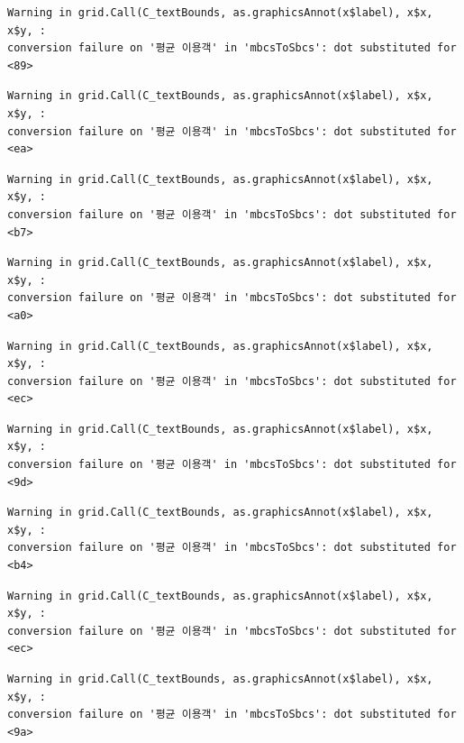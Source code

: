 \documentclass[
  letterpaper,
  DIV=11,
  numbers=noendperiod]{scrreprt}
\begin{document}
\begin{verbatim}
Warning in grid.Call(C_textBounds, as.graphicsAnnot(x$label), x$x, x$y, :
conversion failure on '평균 이용객' in 'mbcsToSbcs': dot substituted for <89>
\end{verbatim}

\begin{verbatim}
Warning in grid.Call(C_textBounds, as.graphicsAnnot(x$label), x$x, x$y, :
conversion failure on '평균 이용객' in 'mbcsToSbcs': dot substituted for <ea>
\end{verbatim}

\begin{verbatim}
Warning in grid.Call(C_textBounds, as.graphicsAnnot(x$label), x$x, x$y, :
conversion failure on '평균 이용객' in 'mbcsToSbcs': dot substituted for <b7>
\end{verbatim}

\begin{verbatim}
Warning in grid.Call(C_textBounds, as.graphicsAnnot(x$label), x$x, x$y, :
conversion failure on '평균 이용객' in 'mbcsToSbcs': dot substituted for <a0>
\end{verbatim}

\begin{verbatim}
Warning in grid.Call(C_textBounds, as.graphicsAnnot(x$label), x$x, x$y, :
conversion failure on '평균 이용객' in 'mbcsToSbcs': dot substituted for <ec>
\end{verbatim}

\begin{verbatim}
Warning in grid.Call(C_textBounds, as.graphicsAnnot(x$label), x$x, x$y, :
conversion failure on '평균 이용객' in 'mbcsToSbcs': dot substituted for <9d>
\end{verbatim}

\begin{verbatim}
Warning in grid.Call(C_textBounds, as.graphicsAnnot(x$label), x$x, x$y, :
conversion failure on '평균 이용객' in 'mbcsToSbcs': dot substituted for <b4>
\end{verbatim}

\begin{verbatim}
Warning in grid.Call(C_textBounds, as.graphicsAnnot(x$label), x$x, x$y, :
conversion failure on '평균 이용객' in 'mbcsToSbcs': dot substituted for <ec>
\end{verbatim}

\begin{verbatim}
Warning in grid.Call(C_textBounds, as.graphicsAnnot(x$label), x$x, x$y, :
conversion failure on '평균 이용객' in 'mbcsToSbcs': dot substituted for <9a>
\end{verbatim}
\end{document}

